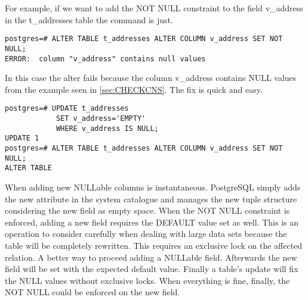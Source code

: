 For example, if we want to add the NOT NULL constraint to the field v\_address in the t\_addresses
table the command is just.

\begin{lstlisting}[style=pgsql]
postgres=# ALTER TABLE t_addresses ALTER COLUMN v_address SET NOT NULL;
ERROR:  column "v_address" contains null values

\end{lstlisting}

In this case the alter fails because the column v\_address contains NULL values from the example
seen in \ref{sec:CHECKCNS}. The fix is quick and easy.

\begin{lstlisting}[style=pgsql]
postgres=# UPDATE t_addresses
            SET v_address='EMPTY'
            WHERE v_address IS NULL;
UPDATE 1
postgres=# ALTER TABLE t_addresses ALTER COLUMN v_address SET NOT NULL;
ALTER TABLE

\end{lstlisting}

When adding new NULLable columns is instantaneous. PostgreSQL simply adds the new attribute in the
system catalogue and manages the new tuple structure considering the new field as empty space.
When the NOT NULL constraint is enforced, adding a new field requires the DEFAULT value set as well. This
is an operation to consider carefully when dealing with large data sets because the table will be
completely rewritten. This requires an exclusive lock on the affected relation. A better way to proceed
adding a NULLable field. Afterwards the new field will be set with the expected default value. Finally a
table's update will fix the NULL values without exclusive locks. When everything is fine, finally, the
NOT NULL could be enforced on the new field.
